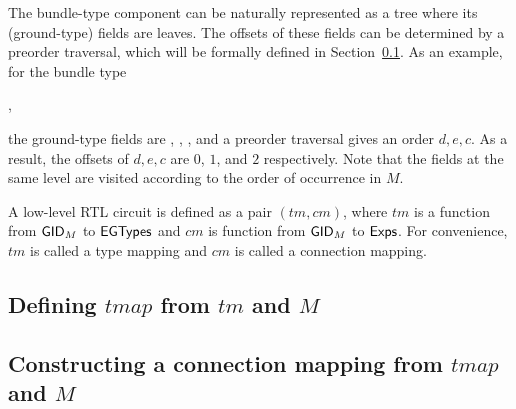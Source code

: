 The bundle-type component can be naturally represented as a tree where its (ground-type) fields are leaves. The offsets of these fields can be determined by a preorder traversal, which will be formally defined in Section~\ref{sec-construct-tmap}. As an example, for the bundle type
\begin{center}
,
\end{center}
%
the ground-type fields are , , , and a preorder traversal gives an order $d, e, c$. As a result, the offsets of $d, e, c$ are $0$, $1$, and $2$ respectively. Note that %
the fields at the same level are visited %
according to the order of occurrence in $M$. %
 	
\begin{definition}
A low-level RTL circuit is defined as a pair $(tm, cm)$, where $tm$ is a function from $\mathsf{GID}_M$ to ${\sf EGTypes}$
and $cm$ is function from $\mathsf{GID}_M$ to ${\sf Exps}$. %
For convenience, $tm$ is called a type mapping and $cm$ is called a connection mapping.
\end{definition}

\subsection{Defining $tmap$ from $tm$ and $M$} \label{sec-construct-tmap}



\subsection{Constructing a connection mapping from $tmap$ and $M$}\label{sec-construct-graph}



